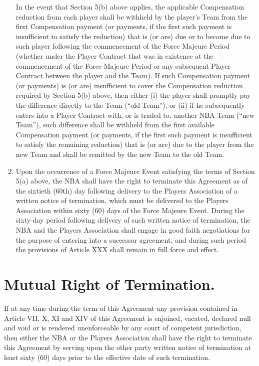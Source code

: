 \documentclass[
]{book}
\begin{document}
\begin{enumerate}
  In the event that Section 5(b) above applies, the applicable Compensation reduction from each player shall be withheld by the player's Team from the first Compensation payment (or payments, if the first such payment is insufficient to satisfy the reduction) that is (or are) due or to become due to such player following the commencement of the Force Majeure Period (whether under the Player Contract that was in existence at the commencement of the Force Majeure Period or any subsequent Player Contract between the player and the Team). If such Compensation payment (or payments) is (or are) insufficient to cover the Compensation reduction required by Section 5(b) above, then either (i) the player shall promptly pay the difference directly to the Team (``old Team''), or (ii) if he subsequently enters into a Player Contract with, or is traded to, another NBA Team (``new Team''), such difference shall be withheld from the first available Compensation payment (or payments, if the first such payment is insufficient to satisfy the remaining reduction) that is (or are) due to the player from the new Team and shall be remitted by the new Team to the old Team.
\item
  Upon the occurrence of a Force Majeure Event satisfying the terms of Section 5(a) above, the NBA shall have the right to terminate this Agreement as of the sixtieth (60th) day following delivery to the Players Association of a written notice of termination, which must be delivered to the Players Association within sixty (60) days of the Force Majeure Event. During the sixty-day period following delivery of such written notice of termination, the NBA and the Players Association shall engage in good faith negotiations for the purpose of entering into a successor agreement, and during such period the provisions of Article XXX shall remain in full force and effect.
\end{enumerate}

\hypertarget{mutual-right-of-termination.}{%
\section{Mutual Right of Termination.}\label{mutual-right-of-termination.}}

If at any time during the term of this Agreement any provision contained in Article VII, X, XI and XIV of this Agreement is enjoined, vacated, declared null and void or is rendered unenforceable by any court of competent jurisdiction, then either the NBA or the Players Association shall have the right to terminate this Agreement by serving upon the other party written notice of termination at least sixty (60) days prior to the effective date of such termination.
\end{document}

